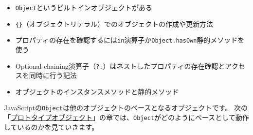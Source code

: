 \begin{itemize}
\item
  \texttt{Object}というビルトインオブジェクトがある
\item
  \texttt{\{\}}（オブジェクトリテラル）でのオブジェクトの作成や更新方法
\item
  プロパティの存在を確認するには\texttt{in}演算子か\texttt{Object.hasOwn}静的メソッドを使う
\item
  Optional chaining演算子（\texttt{?.}）はネストしたプロパティの存在確認とアクセスを同時に行う記法
\item
  オブジェクトのインスタンスメソッドと静的メソッド
\end{itemize}

JavaScriptの\texttt{Object}は他のオブジェクトのベースとなるオブジェクトです。
次の「\hyperlink{prototype-object}{プロトタイプオブジェクト}」の章では、\texttt{Object}がどのようにベースとして動作しているのかを見ていきます。
